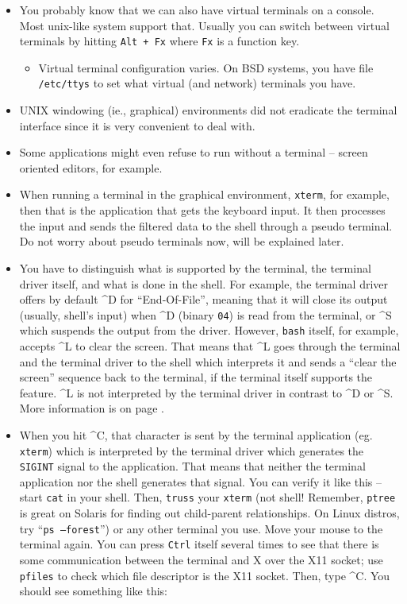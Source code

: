 \begin{itemize}
\item You probably know that we can also have virtual terminals on a console.
Most un{}ix-like system support that. Usually you can switch between virtual
terminals by hitting \texttt{Alt + Fx} where \texttt{Fx} is a function key.
	\begin{itemize}
	\item Virtual terminal configuration varies. On BSD systems, you have
	file \texttt{/etc/ttys} to set what virtual (and network) terminals you
	have.
	\end{itemize}
\item UNIX windowing (ie., graphical) environments did not eradicate the
terminal interface since it is very convenient to deal with.
\item Some applications might even refuse to run without a terminal -- screen
oriented editors, for example.
\item When running a terminal in the graphical environment, \texttt{xterm}, for
example, then that is the application that gets the keyboard input. It then
processes the input and sends the filtered data to the shell through a pseudo
terminal. Do not worry about pseudo terminals now, will be explained later.
\item You have to distinguish what is supported by the terminal, the terminal
driver itself, and what is done in the shell. For example, the terminal driver
offers by default \^{}D for ``End-Of-File'', meaning that it will close its
output (usually, shell's input) when \^{}D (binary \texttt{04}) is read
from the terminal, or \^{}S which suspends the output from the driver. However,
\texttt{bash} itself, for example, accepts \^{}L to clear the screen. That means
that \^{}L goes through the terminal and the terminal driver to the shell which
interprets it and sends a ``clear the screen'' sequence back to the terminal, if
the terminal itself supports the feature. \^{}L is not interpreted by the
terminal driver in contrast to \^{}D or \^{}S. More information is on page
\pageref{TERMIOS}.
\item When you hit \^{}C, that character is sent by the terminal application
(eg. \texttt{xterm}) which is interpreted by the terminal driver which generates
the \texttt{SIGINT} signal to the application. That means that neither the
terminal application nor the shell generates that signal. You can verify it like
this -- start \texttt{cat} in your shell. Then, \texttt{truss} your
\texttt{xterm} (not shell! Remember, \texttt{ptree} is great on Solaris for
finding out child-parent relationships. On Linux distros, try ``\texttt{ps
--forest}'') or any other terminal you use. Move your mouse to the terminal
again. You can press \texttt{Ctrl} itself several times to see that there is
some communication between the terminal and X over the X11 socket; use
\texttt{pfiles} to check which file descriptor is the X11 socket. Then, type
\^{}C. You should see something like this:


\end{itemize}
